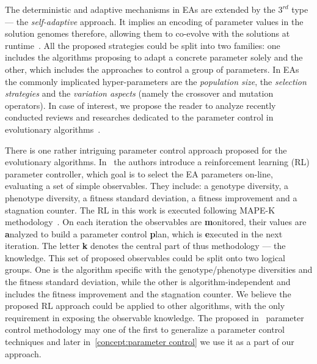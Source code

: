 The deterministic and adaptive mechanisms in EAs are extended by the $3^{rd}$ type — the \emph{self-adaptive} approach. It implies an encoding of parameter values in the solution genomes therefore, allowing them to co-evolve with the solutions at runtime~\cite{doerr2020theory}. All the proposed strategies could be split into two families: one includes the algorithms proposing to adapt a concrete parameter solely and the other, which includes the approaches to control a group of parameters. In EAs the commonly implicated hyper-parameters are the \emph{population size}, the \emph{selection strategies} and the \emph{variation aspects} (namely the crossover and mutation operators). In case of interest, we propose the reader to analyze recently conducted reviews and researches dedicated to the parameter control in evolutionary algorithms~\cite{karafotias2014parameter,aleti2016systematic,smith2020self,doerr2020theory}.

There is one rather intriguing parameter control approach proposed for the evolutionary algorithms. In~\cite{karafotias2014generic} the authors introduce a reinforcement learning (RL) parameter controller, which goal is to select the EA parameters on-line, evaluating a set of simple observables. They include: a genotype diversity, a phenotype diversity, a fitness standard deviation, a fitness improvement and a stagnation counter.
The RL in this work is executed following MAPE-K methodology~\cite{brun2009engineering}. On each iteration the observables are \textbf{m}onitored, their values are \textbf{a}nalyzed to build a parameter control \textbf{p}lan, which is \textbf{e}xecuted in the next iteration. The letter \textbf{k} denotes the central part of thus methodology — the knowledge.
This set of proposed observables could be split onto two logical groups. One is the algorithm specific with the genotype/phenotype diversities and the fitness standard deviation, while the other is algorithm-independent and includes the fitness improvement and the stagnation counter. We believe the proposed RL approach could be applied to other algorithms, with the only requirement in exposing the observable knowledge. The proposed in~\cite{karafotias2014generic} parameter control methodology may one of the first to generalize a parameter control techniques and later in~\cref{concept:parameter control} we use it as a part of our approach.


